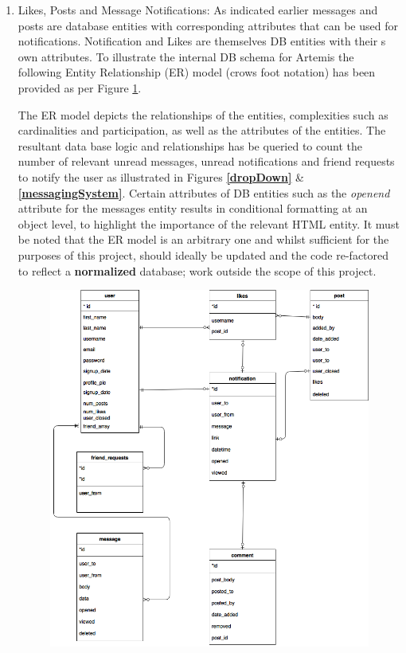 \begin{enumerate}
   
    \item Likes, Posts and  Message Notifications: As indicated earlier messages and posts are database entities with corresponding attributes that can be used for notifications. Notification and Likes are themselves DB entities with their s own attributes. To illustrate the internal DB schema for Artemis the following Entity Relationship (ER) model (crows foot notation) has been provided as per Figure \ref{ERmodel}.
    
    The ER model depicts the relationships of the entities, complexities such as cardinalities and participation, as well as the attributes of the entities. The resultant data base logic and relationships has be queried to count the number of relevant unread messages, unread notifications and friend requests to notify the user as illustrated in Figures \textbf{\ref{dropDown} } \& \textbf{\ref{messagingSystem}}. Certain  attributes of DB entities such as the \textit{openend} attribute for the messages entity  results in conditional formatting at an object level, to highlight the importance of the relevant HTML entity. It must be noted that the ER model is an arbitrary one and whilst sufficient for the purposes of this project, should ideally be updated and the code re-factored to reflect a \textbf{normalized} database; work outside the scope of this project.
    
    

    \begin{figure}[h]
    	\includegraphics[scale=0.40,center]{chapters/chapter04/figures/crowsFoot.png}
    	\label{ERmodel}
    \end{figure}


\end{enumerate}
